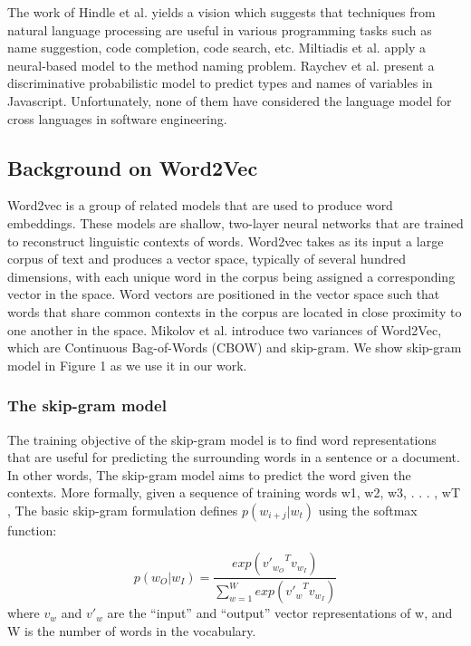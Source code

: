 The work of Hindle et al. \cite{hindle2012naturalness} yields a vision which suggests that techniques from natural language processing are useful in various programming tasks such as name suggestion, code completion, code search, etc. Miltiadis et al. \cite{allamanis2015suggesting} apply a neural-based model to the method naming problem. Raychev  et al.\cite{raychev2015predicting} present a discriminative probabilistic model to predict types and names of variables in Javascript. Unfortunately, none of them have considered the language model for cross languages in software engineering.

\subsection{Background on Word2Vec}

Word2vec is a group of related models that are used to produce word embeddings. These models are shallow, two-layer neural networks that are trained to reconstruct linguistic contexts of words. Word2vec takes as its input a large corpus of text and produces a vector space, typically of several hundred dimensions, with each unique word in the corpus being assigned a corresponding vector in the space. Word vectors are positioned in the vector space such that words that share common contexts in the corpus are located in close proximity to one another in the space. Mikolov et al.\cite{mikolov2013distributed} introduce two variances of Word2Vec, which are Continuous Bag-of-Words (CBOW) and skip-gram. We show skip-gram model in Figure 1 as we use it in our work.

\subsubsection{The skip-gram model}
The training objective of the skip-gram model is to find word representations that are useful for predicting the surrounding words in a sentence or a document. In other words, The skip-gram model aims to predict the word given the contexts. More formally, given a sequence of training words w1, w2, w3, . . . , wT , The basic skip-gram formulation defines \begin{math}p(w_{i+j} | w_{t})\end{math} using the softmax function:

\begin{displaymath}
p(w_{O}|w_{I}) = \frac{exp({{v'}_{w_{O}}}^{T}v_{w_{I}})}    {\sum_{w=1}^W exp({{v'}_{w}}^{T}v_{w_{I}})}
\end{displaymath}
where \begin{math}v_{w}\end{math} and \begin{math}{v'}_{w}\end{math} are the “input” and “output” vector representations of w, and W is the number of words in the vocabulary.

